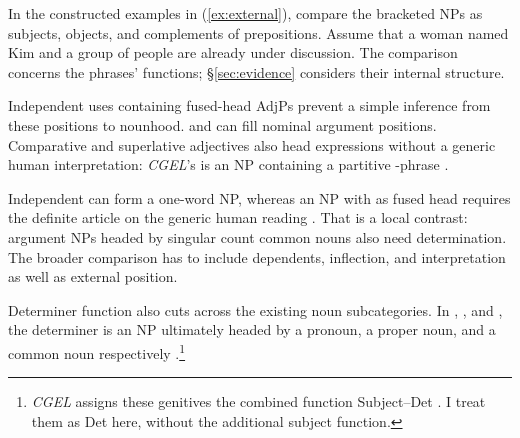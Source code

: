 \documentclass[12pt]{article}
\begin{document}
In the constructed examples in (\ref{ex:external}), compare the bracketed NPs as subjects, objects, and complements of prepositions. Assume that a woman named Kim and a group of people are already under discussion. The comparison concerns the phrases' functions; §\ref{sec:evidence} considers their internal structure.

\begin{samepage}

\ea\label{ex:external}
\ea {}\qquad {}\qquad {}
\ex {}\qquad {}\qquad {}
\ex {}\qquad {}\qquad {}
\ex {}\qquad {}\qquad {}
\z\z

\end{samepage}

Independent uses containing fused-head AdjPs prevent a simple inference from these positions to nounhood.  and  can fill nominal argument positions. Comparative and superlative adjectives also head expressions without a generic human interpretation: \textit{CGEL}'s  is an NP containing a partitive -phrase \citep[332--333, 416--423]{huddleston2002}.

Independent  can form a one-word NP, whereas an NP with  as fused head requires the definite article  on the generic human reading \citep[417--418]{huddleston2002}. That is a local contrast: argument NPs headed by singular count common nouns also need determination. The broader comparison has to include dependents, inflection, and interpretation as well as external position.

Determiner function also cuts across the existing noun subcategories. In , , and , the determiner is an NP ultimately headed by a pronoun, a proper noun, and a common noun respectively \citep[354--355, 470--471]{huddleston2002}.\footnote{\textit{CGEL} assigns these genitives the combined function Subject--Det \citep[472--473]{huddleston2002}. I treat them as Det here, without the additional subject function.}
\end{document}

